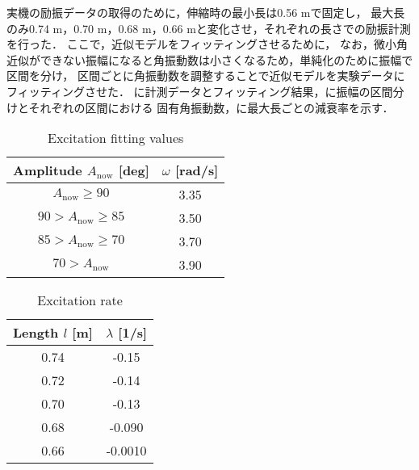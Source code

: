           実機の励振データの取得のために，伸縮時の最小長は0.56 mで固定し，
          最大長のみ0.74 m，0.70 m，0.68 m，0.66 mと変化させ，それぞれの長さでの励振計測を行った．
          ここで，近似モデルをフィッティングさせるために，
          なお，微小角近似ができない振幅になると角振動数は小さくなるため，単純化のために振幅で区間を分け，
          区間ごとに角振動数を調整することで近似モデルを実験データにフィッティングさせた．
          \figref{}に計測データとフィッティング結果，に振幅の区間分けとそれぞれの区間における
          固有角振動数，に最大長ごとの減衰率を示す．
          \begin{table}[tb]
            \begin{center}
              \caption{Excitation fitting values}
              \vspace{2mm}
              \begin{tabular}{c|c}
                \hline
                Amplitude $A_{\mathrm{now}}$ [deg] & $\omega$ [rad/s]\\
                \hline
                $A_{\mathrm{now}}\ge90$ & 3.35 \\
                $90>A_{\mathrm{now}}\ge85$ & 3.50 \\
                $85>A_{\mathrm{now}}\ge70$ & 3.70 \\
                $70>A_{\mathrm{now}}$ & 3.90 \\                   
                \hline
              \end{tabular}
            \end{center}
          \end{table}
          \begin{table}[tb]
            \begin{center}
              \caption{Excitation rate}
              \vspace{2mm}
              \begin{tabular}{c|c}
                \hline
                Length $l$ [m] & $\lambda$ [1/s] \\
                \hline
                0.74 & -0.15 \\
                0.72 & -0.14 \\
                0.70 & -0.13 \\
                0.68 & -0.090 \\
                0.66 & -0.0010 \\                     
                \hline
              \end{tabular}
            \end{center}
          \end{table}
